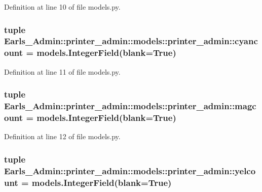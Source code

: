 Definition at line 10 of file models.py.\hypertarget{classEarls__Admin_1_1printer__admin_1_1models_1_1printer__admin_24b1e2370cd39566887e2f5c6de5fc12}{
\subsubsection[cyancount]{\setlength{\rightskip}{0pt plus 5cm}tuple {\bf Earls\_\-Admin::printer\_\-admin::models::printer\_\-admin::cyancount} = models.IntegerField(blank=True)}}
\label{classEarls__Admin_1_1printer__admin_1_1models_1_1printer__admin_24b1e2370cd39566887e2f5c6de5fc12}




Definition at line 11 of file models.py.\hypertarget{classEarls__Admin_1_1printer__admin_1_1models_1_1printer__admin_f7ebc1178ac487df8793da6a4dc45f1c}{
\subsubsection[magcount]{\setlength{\rightskip}{0pt plus 5cm}tuple {\bf Earls\_\-Admin::printer\_\-admin::models::printer\_\-admin::magcount} = models.IntegerField(blank=True)}}
\label{classEarls__Admin_1_1printer__admin_1_1models_1_1printer__admin_f7ebc1178ac487df8793da6a4dc45f1c}




Definition at line 12 of file models.py.\hypertarget{classEarls__Admin_1_1printer__admin_1_1models_1_1printer__admin_cd575b8e33c580feda59ce2150cade37}{
\subsubsection[yelcount]{\setlength{\rightskip}{0pt plus 5cm}tuple {\bf Earls\_\-Admin::printer\_\-admin::models::printer\_\-admin::yelcount} = models.IntegerField(blank=True)}}
\label{classEarls__Admin_1_1printer__admin_1_1models_1_1printer__admin_cd575b8e33c580feda59ce2150cade37}




